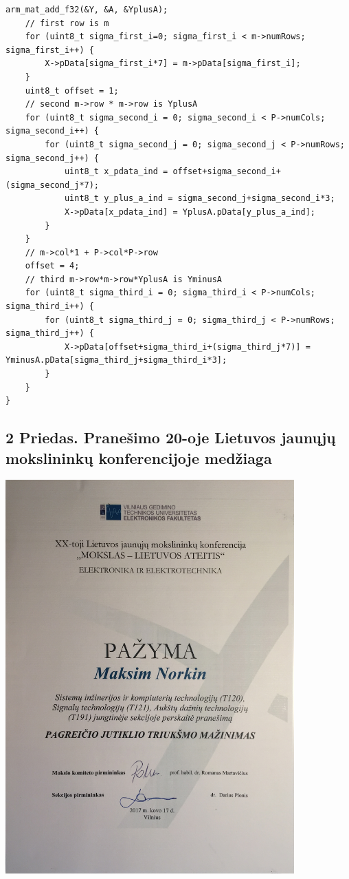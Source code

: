 \begin{lstlisting}[caption=sigma\_points.c]
    arm_mat_add_f32(&Y, &A, &YplusA);
    // first row is m
    for (uint8_t sigma_first_i=0; sigma_first_i < m->numRows; sigma_first_i++) {
        X->pData[sigma_first_i*7] = m->pData[sigma_first_i];
    }
    uint8_t offset = 1;
    // second m->row * m->row is YplusA
    for (uint8_t sigma_second_i = 0; sigma_second_i < P->numCols; sigma_second_i++) {
        for (uint8_t sigma_second_j = 0; sigma_second_j < P->numRows; sigma_second_j++) {
            uint8_t x_pdata_ind = offset+sigma_second_i+(sigma_second_j*7);
            uint8_t y_plus_a_ind = sigma_second_j+sigma_second_i*3;
            X->pData[x_pdata_ind] = YplusA.pData[y_plus_a_ind];
        }
    }
    // m->col*1 + P->col*P->row
    offset = 4;
    // third m->row*m->row*YplusA is YminusA
    for (uint8_t sigma_third_i = 0; sigma_third_i < P->numCols; sigma_third_i++) {
        for (uint8_t sigma_third_j = 0; sigma_third_j < P->numRows; sigma_third_j++) {
            X->pData[offset+sigma_third_i+(sigma_third_j*7)] = YminusA.pData[sigma_third_j+sigma_third_i*3];
        }
    }
}

\end{lstlisting}

\subsection*{2 Priedas. Pranešimo 20-oje Lietuvos jaunųjų mokslininkų konferencijoje medžiaga}

\begin{centering}
    \includegraphics[width=420px]{img/IMG_0415.JPG}
\end{centering}

